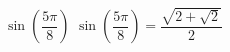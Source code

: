 {$\sin \left( \dfrac{5\pi}{8} \right)$}
{$\sin \left( \dfrac{5\pi}{8} \right) = \dfrac{\sqrt{2 + \sqrt{2}}}{2}$}
